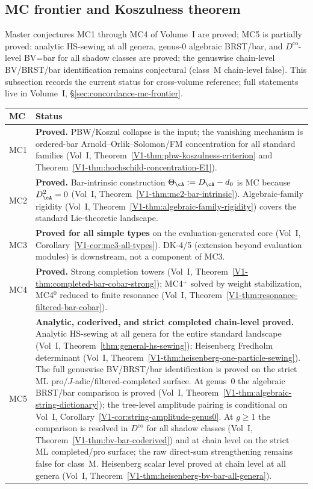 \subsection{MC frontier and Koszulness theorem}

Master conjectures MC1 through MC4 of Volume~I are proved;
MC5 is partially proved: analytic HS-sewing at all genera,
genus-$0$ algebraic BRST/bar, and $D^{\mathrm{co}}$-level BV=bar
for all shadow classes are proved; the genuswise chain-level
BV/BRST/bar identification remains conjectural (class~M chain-level
false). This subsection records the current
status for cross-volume reference; full statements live in
Volume~I, \S\ref*{sec:concordance-mc-frontier}.

\begin{center}
\renewcommand{\arraystretch}{1.3}
\begin{tabular}{lp{}}
\textbf{MC} & \textbf{Status} \\
\hline
MC1 & \textbf{Proved.} PBW/Koszul collapse is the input; the
vanishing mechanism is ordered-bar Arnold--Orlik--Solomon/FM
concentration for all standard families
(Vol~I, Theorem~\ref*{V1-thm:pbw-koszulness-criterion}
and Theorem~\ref*{V1-thm:hochschild-concentration-E1}). \\
MC2 & \textbf{Proved.} Bar-intrinsic construction
 $\Theta_\cA := D_\cA - d_0$ is MC because $D_\cA^2 = 0$
 (Vol~I, Theorem~\ref*{V1-thm:mc2-bar-intrinsic}).
 Algebraic-family rigidity
 (Vol~I, Theorem~\ref*{V1-thm:algebraic-family-rigidity})
 covers the standard Lie-theoretic landscape. \\
MC3 & \textbf{Proved for all simple types} on the
 evaluation-generated core
 (Vol~I, Corollary~\ref*{V1-cor:mc3-all-types}).
 DK-4/5 (extension beyond evaluation modules)
 is downstream, not a component of MC3. \\
MC4 & \textbf{Proved.} Strong completion towers
 (Vol~I, Theorem~\ref*{V1-thm:completed-bar-cobar-strong});
 MC4${}^+$ solved by weight stabilization,
 MC4${}^0$ reduced to finite resonance
 (Vol~I, Theorem~\ref*{V1-thm:resonance-filtered-bar-cobar}). \\
MC5 & \textbf{Analytic, coderived, and strict completed chain-level proved.} Analytic HS-sewing at all
 genera for the entire standard landscape
 (Vol~I, Theorem~\ref*{thm:general-hs-sewing});
 Heisenberg Fredholm determinant
 (Vol~I, Theorem~\ref*{V1-thm:heisenberg-one-particle-sewing}).
 The full genuswise BV/BRST/bar identification is proved on the
 strict ML pro/$J$-adic/filtered-completed surface. At genus~$0$ the algebraic BRST/bar comparison is
 proved
 (Vol~I, Theorem~\ref*{V1-thm:algebraic-string-dictionary});
 the tree-level amplitude pairing is conditional on
 Vol~I, Corollary~\ref*{V1-cor:string-amplitude-genus0}.
 At $g \geq 1$ the comparison is resolved in $D^{\mathrm{co}}$
 for all shadow classes
 (Vol~I, Theorem~\ref*{V1-thm:bv-bar-coderived}) and at chain level
 on the strict ML completed/pro surface; the raw direct-sum
 strengthening remains false for class~M.
 Heisenberg scalar level proved at chain level at all genera
 (Vol~I, Theorem~\ref*{V1-thm:heisenberg-bv-bar-all-genera}).
\end{tabular}
\end{center}

